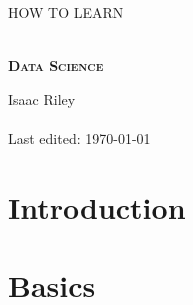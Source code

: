 \documentclass[a4, 12pt]{article}
\begin{document}
\begin{titlepage}


\thispagestyle{fancy}

\vphantom{x}

\vspace{0.5in}

\center


\textsc{\large HOW TO LEARN}

\vspace{0.5in}

\noindent\makebox[\linewidth]{\rule{\linewidth}{1.2pt}}\\
\vspace{2mm}
\textsc{ \textbf{\large Data Science }}
\noindent\makebox[\linewidth]{\rule{\linewidth}{1.2pt}}

\vspace{2.5in}
Isaac Riley\\~\\

Last edited: \today

\end{titlepage}

\newpage

\setcounter{page}{2}
\tableofcontents
\newpage

\section{Introduction}

\section{Basics}



\end{document}
